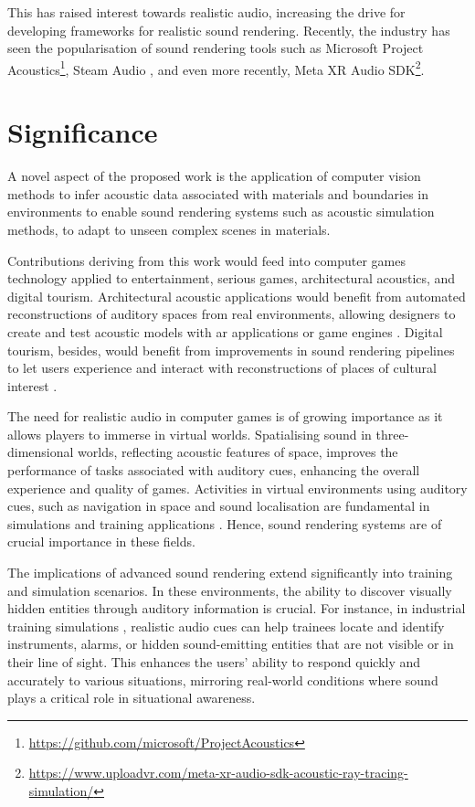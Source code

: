 This has raised interest towards realistic audio, increasing the drive for developing frameworks for realistic sound rendering. Recently, the industry has seen the popularisation of sound rendering tools such as Microsoft Project Acoustics\footnote{\url{https://github.com/microsoft/ProjectAcoustics}}, Steam Audio \citep{audio2020git}, and even more recently, Meta XR Audio SDK\footnote{\url{https://www.uploadvr.com/meta-xr-audio-sdk-acoustic-ray-tracing-simulation/}}.

\section{Significance}
A novel aspect of the proposed work is the application of computer vision methods to infer acoustic data associated with materials and boundaries in environments to enable sound rendering systems such as acoustic simulation methods, to adapt to unseen complex scenes in materials.\par
Contributions deriving from this work would feed into computer games technology applied to entertainment, serious games, architectural acoustics, and digital tourism. Architectural acoustic applications would benefit from automated reconstructions of auditory spaces from real environments, allowing designers to create and test acoustic models with \acrshort{ar} applications or game engines \citep{berardi2016acoustic}. Digital tourism, besides, would benefit from improvements in sound rendering pipelines to let users experience and interact with reconstructions of places of cultural interest \citep{schofield2018viking}.\par
The need for realistic audio in computer games is of growing importance as it allows players to immerse in virtual worlds. Spatialising sound in three-dimensional worlds, reflecting acoustic features of space, improves the performance of tasks associated with auditory cues, enhancing the overall experience and quality of games. Activities in virtual environments using auditory cues, such as navigation in space and sound localisation are fundamental in simulations and training applications \citep{lokki2005navigation}. Hence, sound rendering systems are of crucial importance in these fields.\par
The implications of advanced sound rendering extend significantly into training and simulation scenarios. In these environments, the ability to discover visually hidden entities through auditory information is crucial. For instance, in industrial training simulations \citep{machala2022application}, realistic audio cues can help trainees locate and identify instruments, alarms, or hidden sound-emitting entities that are not visible or in their line of sight. This enhances the users' ability to respond quickly and accurately to various situations, mirroring real-world conditions where sound plays a critical role in situational awareness.\par
